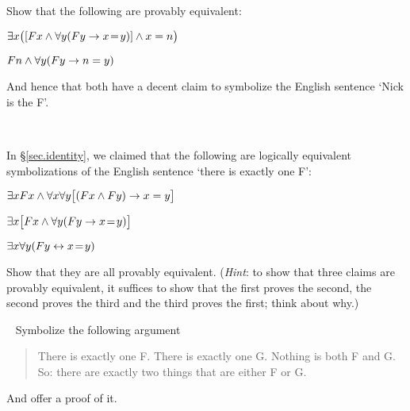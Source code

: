 \problempart
Show that the following are provably equivalent:
\begin{ebullet}
\item $\exists x \bigl([Fx \wedge \forall y (Fy \rightarrow x \!=\! y)] \wedge x = n\bigr)$
\item $Fn \wedge \forall y (Fy \rightarrow n= y)$
\end{ebullet}
And hence that both have a decent claim to symbolize the English sentence `Nick is the F'.

\

\problempart
In \S\ref{sec.identity}, we claimed that the following are logically equivalent symbolizations of the English sentence `there is exactly one F':
\begin{ebullet}
\item $\exists x Fx \wedge \forall x \forall y \bigl[(Fx \wedge Fy) \rightarrow x = y\bigr]$
\item $\exists x \bigl[Fx \wedge \forall y (Fy \rightarrow x \!=\! y)\bigr]$
\item $\exists x \forall y (Fy \leftrightarrow x \!=\! y)$
\end{ebullet}
Show that they are all provably equivalent. (\emph{Hint}: to show that three claims are provably equivalent, it suffices to show that the first proves the second, the second proves the third and the third proves the first; think about why.)


\
\problempart
Symbolize the following argument
	\begin{quote}
		There is exactly one F. There is exactly one G. Nothing is both F and G. So: there are exactly two things that are either F or G.
	\end{quote}
And offer a proof of it.
